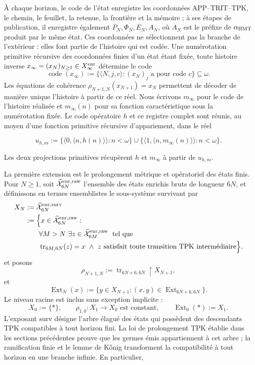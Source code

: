 À chaque horizon, le code de l'état enregistre les coordonnées APP--TRIT--TPK, le chemin, le feuillet, la retenue, la frontière et la mémoire ; à ses étapes de publication, il enregistre également \(P_N,\Phi_N,E_N,A_N\), où \(A_N\) est le préfixe de \(\alpha_{\rm HMT}\) produit par le même état. Ces coordonnées ne sélectionnent pas la branche de l'extérieur : elles font partie de l'histoire qui est codée. Une numérotation primitive récursive des coordonnées finies d'un état étant fixée, toute histoire inverse \(x_\infty=(x_N)_{N\geq1}\in X_\infty^{\rm enr}\) détermine le code
\[
 \operatorname{code}(x_\infty)
 :=\{\langle N,j,c\rangle:(x_N)_j\text{ a pour code }c\}\subseteq\omega.
\]
Les équations de cohérence
\(\rho_{N+1,N}(x_{N+1})=x_N\) permettent de décoder de manière unique
l’histoire à partir de ce réel. Nous écrivons \(m_\infty\) pour le code de
l’histoire réalisée et \(m_\infty(n)\) pour sa fonction caractéristique sous la
numérotation fixée. Le code opératoire \(h\) et ce registre complet sont
réunis, au moyen d’une fonction primitive récursive d’appariement, dans le réel

\[
 u_{h,m}:=
 \{\langle0,\langle n,h(n)\rangle\rangle:n<\omega\}
 \cup
 \{\langle1,\langle n,m_\infty(n)\rangle\rangle:n<\omega\}.
\tag{33a}\label{ix:eq:ch-codigo-conjunto}
\]

Les deux projections primitives récupèrent \(h\) et \(m_\infty\) à partir de \(u_{h,m}\).

La première extension est le prolongement métrique et opératoriel des états finis. Pour \(N\ge1\), soit \(\widehat{\mathcal X}^{\rm enr,raw}_{6N}\) l'ensemble des états enrichis bruts de longueur \(6N\), et définissons en termes ensemblistes le sous-système survivant par
\[
\begin{aligned}
 X_N
 &:=\widehat{\mathcal X}^{\rm enr,surv}_{6N}\\
 &:=\Bigl\{x\in\widehat{\mathcal X}^{\rm enr,raw}_{6N}:\\[-.2ex]
 &\qquad\forall M>N\ \exists z\in
   \widehat{\mathcal X}^{\rm enr,raw}_{6M}\;\text{ tel que}\\[-.2ex]
 &\qquad\operatorname{tr}_{6M,6N}(z)=x\ \wedge\
   z\text{ satisfait toute transition TPK intermédiaire}\Bigr\}.
\end{aligned}
\]
et posons
\[
 \rho_{N+1,N}:=\operatorname{tr}_{6N+6,6N}\!\upharpoonright X_{N+1},
\]
et
\[
 \operatorname{Ext}_N(x):=
 \{y\in X_{N+1}:(x,y)\in
 \operatorname{Ext}_{6N+6,6N}\}.
\]
Le niveau racine est inclus sans exception implicite :
\[
 X_0:=\{\ast\},\qquad
 \rho_{1,0}:X_1\to X_0\text{ est constant},\qquad
 \operatorname{Ext}_0(\ast):=X_1.
\]
L’exposant \(\mathrm{surv}\) désigne
l’arbre élagué des états qui possèdent des descendants TPK compatibles à tout
horizon fini. La loi de prolongement TPK établie dans les sections
précédentes prouve que les germes
émis appartiennent à cet arbre ; la ramification finie et le lemme de Kőnig
transforment la compatibilité à tout horizon en une branche infinie. En
particulier,

